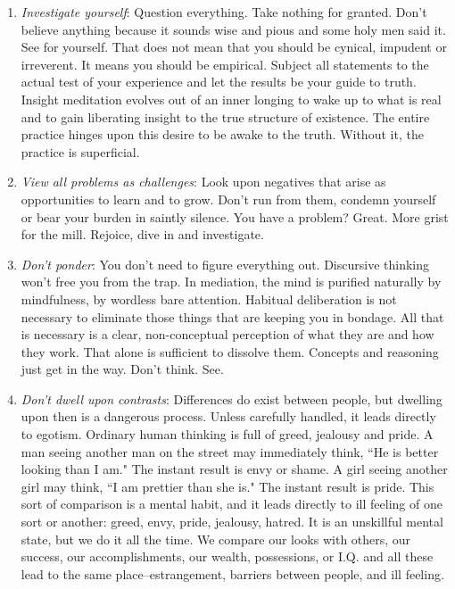 \begin{enumerate}
\item \emph{Investigate yourself}: Question everything. Take nothing for granted. Don't
believe anything because it sounds wise and pious and some holy men said it. See
for yourself. That does not mean that you should be cynical, impudent or
irreverent. It means you should be empirical. Subject all statements to the
actual test of your experience and let the results be your guide to truth.
Insight meditation evolves out of an inner longing to wake up to what is real
and to gain liberating insight to the true structure of existence. The entire
practice hinges upon this desire to be awake to the truth.
Without it, the practice is superficial.

\item \emph{View all problems as challenges}: Look upon negatives that arise as
opportunities to learn and to grow. Don't run from them, condemn yourself or
bear your burden in saintly silence. You have a problem? Great. More grist for
the mill.  Rejoice, dive in and investigate.

\item \emph{Don't ponder}: You don't need to figure everything out. Discursive
thinking won't free you from the trap. In mediation, the mind is purified
naturally by mindfulness, by wordless bare attention. Habitual deliberation is
not necessary to eliminate those things that are keeping you in bondage. All
that is necessary is a clear, non-conceptual perception of what they are and how
they work. That alone is sufficient to dissolve them. Concepts and reasoning
just get in the way. Don't think. See.

\item \emph{Don't dwell upon contrasts}: Differences do exist between people, but
dwelling upon then is a dangerous process. Unless carefully handled, it leads
directly to egotism. Ordinary human thinking is full of greed, jealousy and
pride. A man seeing another man on the street may immediately think, ``He is
better looking than I am." The instant result is envy or shame.
A girl seeing another girl may think, ``I am prettier than she is." The instant
result is pride. This sort of comparison is a mental habit, and it leads
directly to ill feeling of one sort or another: greed, envy, pride, jealousy,
hatred. It is an unskillful mental state, but we do it all the time. We compare
our looks with others, our success, our accomplishments, our wealth,
possessions, or I.Q. and all these lead to the same place--estrangement,
barriers between people, and ill feeling.

\end{enumerate}

